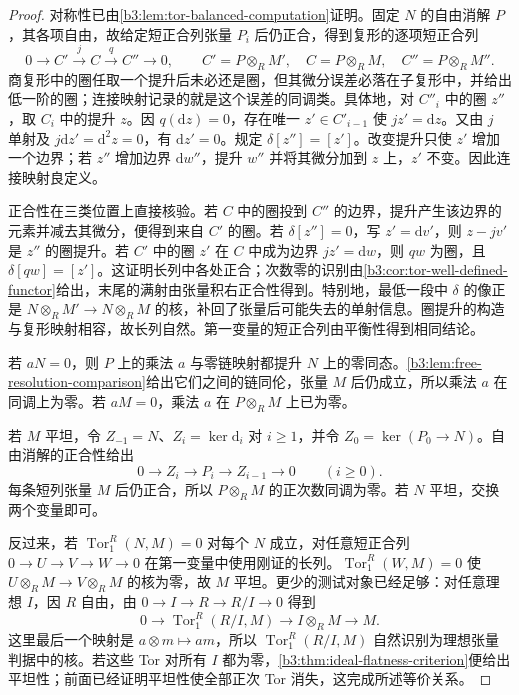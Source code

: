 \begin{proof}
	对称性已由\cref{b3:lem:tor-balanced-computation}证明。固定 \(N\) 的自由消解 \(P\)，其各项自由，故给定短正合列张量 \(P_i\) 后仍正合，得到复形的逐项短正合列
	\[
		0\longrightarrow C'\xrightarrow{j}C\xrightarrow{q}C''\longrightarrow0, \qquad C'=P\otimes_RM',\quad C=P\otimes_RM,\quad C''=P\otimes_RM''.
	\]
	商复形中的圈任取一个提升后未必还是圈，但其微分误差必落在子复形中，并给出低一阶的圈；连接映射记录的就是这个误差的同调类。具体地，对 \(C''_i\) 中的圈 \(z''\)，取 \(C_i\) 中的提升 \(z\)。因 \(q(\mathrm{d}z)=0\)，存在唯一 \(z'\in C'_{i-1}\) 使 \(jz'=\mathrm{d}z\)。又由 \(j\) 单射及 \(j\mathrm{d}z'=\mathrm{d}^2z=0\)，有 \(\mathrm{d}z'=0\)。规定 \(\delta[z'']=[z']\)。改变提升只使 \(z'\) 增加一个边界；若 \(z''\) 增加边界 \(\mathrm{d}w''\)，提升 \(w''\) 并将其微分加到 \(z\) 上，\(z'\) 不变。因此连接映射良定义。

	正合性在三类位置上直接核验。若 \(C\) 中的圈投到 \(C''\) 的边界，提升产生该边界的元素并减去其微分，便得到来自 \(C'\) 的圈。若 \(\delta[z'']=0\)，写 \(z'=\mathrm{d}v'\)，则 \(z-jv'\) 是 \(z''\) 的圈提升。若 \(C'\) 中的圈 \(z'\) 在 \(C\) 中成为边界 \(jz'=\mathrm{d}w\)，则 \(qw\) 为圈，且 \(\delta[qw]=[z']\)。这证明长列中各处正合；次数零的识别由\cref{b3:cor:tor-well-defined-functor}给出，末尾的满射由张量积右正合性得到。特别地，最低一段中 \(\delta\) 的像正是 \(N\otimes_RM'\to N\otimes_RM\) 的核，补回了张量后可能失去的单射信息。圈提升的构造与复形映射相容，故长列自然。第一变量的短正合列由平衡性得到相同结论。

	若 \(aN=0\)，则 \(P\) 上的乘法 \(a\) 与零链映射都提升 \(N\) 上的零同态。\cref{b3:lem:free-resolution-comparison}给出它们之间的链同伦，张量 \(M\) 后仍成立，所以乘法 \(a\) 在同调上为零。若 \(aM=0\)，乘法 \(a\) 在 \(P\otimes_RM\) 上已为零。

	若 \(M\) 平坦，令 \(Z_{-1}=N\)、\(Z_i=\ker\mathrm{d}_i\) 对 \(i\ge1\)，并令 \(Z_0=\ker(P_0\rightarrow N)\)。自由消解的正合性给出
	\[
		0\longrightarrow Z_i\longrightarrow P_i\longrightarrow Z_{i-1}\longrightarrow0 \qquad(i\ge0).
	\]
	每条短列张量 \(M\) 后仍正合，所以 \(P\otimes_RM\) 的正次数同调为零。若 \(N\) 平坦，交换两个变量即可。

	反过来，若 \(\operatorname{Tor}_1^R(N,M)=0\) 对每个 \(N\) 成立，对任意短正合列 \(0\to U\to V\to W\to0\) 在第一变量中使用刚证的长列。\(\operatorname{Tor}_1^R(W,M)=0\) 使 \(U\otimes_RM\to V\otimes_RM\) 的核为零，故 \(M\) 平坦。更少的测试对象已经足够：对任意理想 \(I\)，因 \(R\) 自由，由 \(0\to I\to R\to R/I\to0\) 得到
	\[
		0\longrightarrow\operatorname{Tor}_1^R(R/I,M) \longrightarrow I\otimes_RM\longrightarrow M.
	\]
	这里最后一个映射是 \(a\otimes m\mapsto am\)，所以 \(\operatorname{Tor}_1^R(R/I,M)\) 自然识别为理想张量判据中的核。若这些 Tor 对所有 \(I\) 都为零，\cref{b3:thm:ideal-flatness-criterion}便给出平坦性；前面已经证明平坦性使全部正次 Tor 消失，这完成所述等价关系。


\end{proof}
